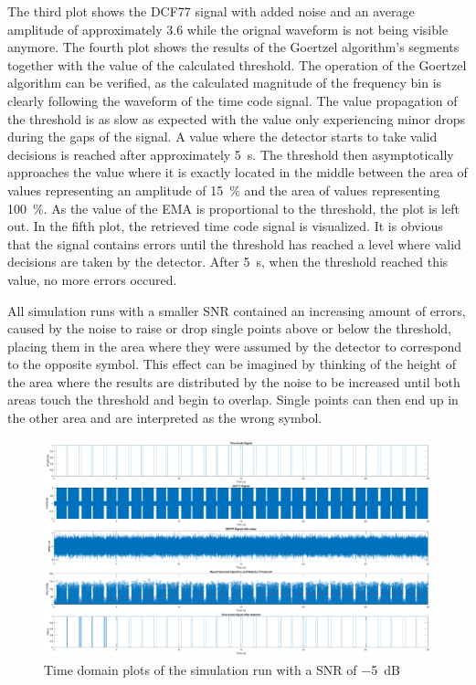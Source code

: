 \documentclass[conference]{IEEEtran}
\begin{document}
The third plot shows the DCF77 signal with added noise and an average amplitude of approximately $3.6$ while the orignal waveform is not being visible anymore.
The fourth plot shows the results of the Goertzel algorithm's segments together with the value of the calculated threshold.
The operation of the Goertzel algorithm can be verified, as the calculated magnitude of the frequency bin is clearly following the waveform of the time code signal.
The value propagation of the threshold is as slow as expected with the value only experiencing minor drops during the gaps of the signal.
A value where the detector starts to take valid decisions is reached after approximately \SI{5}{\second}.
The threshold then asymptotically approaches the value where it is exactly located in the middle between the area of values representing an amplitude of \SI{15}{\percent} and
the area of values representing \SI{100}{\percent}.
As the value of the EMA is proportional to the threshold, the plot is left out.
In the fifth plot, the retrieved time code signal is visualized.
It is obvious that the signal contains errors until the threshold has reached a level where valid decisions are taken by the detector.
After \SI{5}{\second}, when the threshold reached this value, no more errors occured.
\par
All simulation runs with a smaller SNR contained an increasing amount of errors, caused by the noise to raise or drop single points above or below the threshold, placing them in the
area where they were assumed by the detector to correspond to the opposite symbol.
This effect can be imagined by thinking of the height of the area where the results are distributed by the noise to be increased until both areas touch the threshold and begin to overlap.
Single points can then end up in the other area and are interpreted as the wrong symbol. 

\begin{figure}[!htbp]
    \centerline{\includegraphics[width=1.1\textwidth]{img/sim_td_m5dB.eps}}
    \caption{Time domain plots of the simulation run with a SNR of \SI{-5}{\deci\bel}}
    \label{fig:sim_td_m5dB}
\end{figure}
\end{document}

